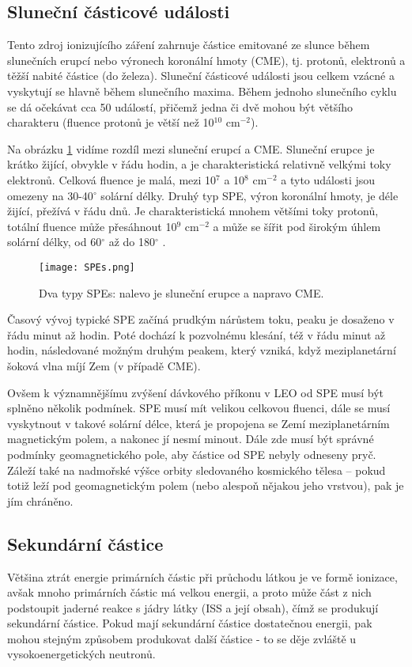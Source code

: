 \subsection{Sluneční částicové události}
Tento zdroj ionizujícího záření zahrnuje částice emitované ze slunce během slunečních erupcí nebo výronech koronální hmoty (CME), tj. protonů, elektronů a těžší nabité částice (do železa). Sluneční částicové události jsou celkem vzácné a vyskytují se hlavně během slunečního maxima. Během jednoho slunečního cyklu se dá očekávat cca 50 událostí, přičemž jedna či dvě mohou být většího charakteru (fluence protonů je větší než 10$^{10}$ cm$^{-2}$).

Na obrázku \ref{fig:SPEs} vidíme rozdíl mezi sluneční erupcí a CME. Sluneční erupce je krátko žijící, obvykle v řádu hodin, a je charakteristická relativně velkými toky elektronů. Celková fluence je malá, mezi 10$^7$ a 10$^8$ cm$^{-2}$ a tyto události jsou omezeny na 30-40$^\circ$ solární délky. Druhý typ SPE, výron koronální hmoty, je déle žijící, přežívá v řádu dnů. Je charakteristická mnohem většími toky protonů, totální fluence může přesáhnout 10$^9$ cm$^{-2}$ a může se šířit pod širokým úhlem solární délky, od 60$^\circ$ až do 180$^\circ$ \cite{benton}.

\begin{figure}[H]
  \centering
  \texttt{[image: SPEs.png]}
  \caption{Dva typy SPEs: nalevo je sluneční erupce a napravo CME. \cite{benton}}
  \label{fig:SPEs}
\end{figure}

Časový vývoj typické SPE začíná prudkým nárůstem toku, peaku je dosaženo v řádu minut až hodin. Poté dochází k pozvolnému klesání, též v řádu minut až hodin, následované možným druhým peakem, který vzniká, když meziplanetární šoková vlna míjí Zem (v případě CME).

Ovšem k významnějšímu zvýšení dávkového příkonu v LEO od SPE musí být splněno několik podmínek. SPE musí mít velikou celkovou fluenci, dále se musí vyskytnout v takové solární délce, která je propojena se Zemí meziplanetárním magnetickým polem, a nakonec jí nesmí minout. Dále zde musí být správné podmínky geomagnetického pole, aby částice od SPE nebyly odneseny pryč. Záleží také na nadmořské výšce orbity sledovaného kosmického tělesa -- pokud totiž leží pod geomagnetickým polem (nebo alespoň nějakou jeho vrstvou), pak je jím chráněno.
\subsection{Sekundární částice}
Většina ztrát energie primárních částic při průchodu látkou je ve formě ionizace, avšak mnoho primárních částic má velkou energii, a proto může část z nich podstoupit jaderné reakce s jádry látky (ISS a její obsah), čímž se produkují sekundární částice. Pokud mají sekundární částice dostatečnou energii, pak mohou stejným způsobem produkovat další částice - to se děje zvláště u vysokoenergetických neutronů.

